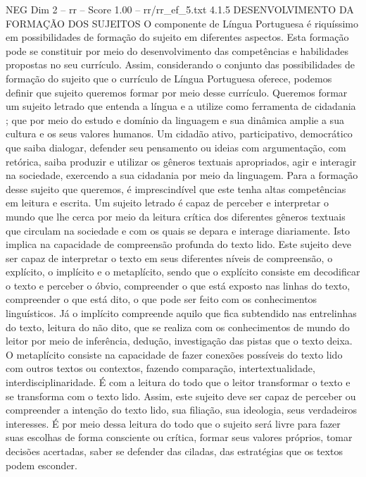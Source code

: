 \begin{textsample}{NEG Dim 2 – rr – Score 1.00 – rr/rr\_ef\_5.txt}  \label{ex:f2_neg_189}
4.1.5 DESENVOLVIMENTO DA FORMAÇÃO DOS SUJEITOS O componente de Língua Portuguesa é riquíssimo em possibilidades de formação do sujeito em diferentes aspectos.
Esta formação pode se constituir por meio do desenvolvimento das competências e habilidades propostas no seu currículo.
Assim, considerando o conjunto das possibilidades de formação do sujeito que o currículo de Língua Portuguesa oferece, podemos definir que sujeito queremos formar por meio desse currículo.
Queremos formar um sujeito letrado que entenda a língua e a utilize como ferramenta de cidadania ; que por meio do estudo e domínio da linguagem e sua dinâmica amplie a sua cultura e os seus valores humanos.
Um cidadão ativo, participativo, democrático que saiba dialogar, defender seu pensamento ou ideias com argumentação, com retórica, saiba produzir e utilizar os gêneros textuais apropriados, agir e interagir na sociedade, exercendo a sua cidadania por meio da linguagem.
Para a formação desse sujeito que queremos, é imprescindível que este tenha altas competências em leitura e escrita.
Um sujeito letrado é capaz de perceber e interpretar o mundo que lhe cerca por meio da leitura crítica dos diferentes gêneros textuais que circulam na sociedade e com os quais se depara e interage diariamente.
Isto implica na capacidade de compreensão profunda do texto lido.
Este sujeito deve ser capaz de interpretar o texto em seus diferentes níveis de compreensão, o explícito, o implícito e o metaplícito, sendo que o explícito consiste em decodificar o texto e perceber o óbvio, compreender o que está exposto nas linhas do texto, compreender o que está dito, o que pode ser feito com os conhecimentos linguísticos.
Já o implícito compreende aquilo que fica subtendido nas entrelinhas do texto, leitura do não dito, que se realiza com os conhecimentos de mundo do leitor por meio de inferência, dedução, investigação das pistas que o texto deixa.
O metaplícito consiste na capacidade de fazer conexões possíveis do texto lido com outros textos ou contextos, fazendo comparação, intertextualidade, interdisciplinaridade.
É com a leitura do todo que o leitor transformar o texto e se transforma com o texto lido.
Assim, este sujeito deve ser capaz de perceber ou compreender a intenção do texto lido, sua filiação, sua ideologia, seus verdadeiros interesses.
É por meio dessa leitura do todo que o sujeito será livre para fazer suas escolhas de forma consciente ou crítica, formar seus valores próprios, tomar decisões acertadas, saber se defender das ciladas, das estratégias que os textos podem esconder.

\end{textsample}
